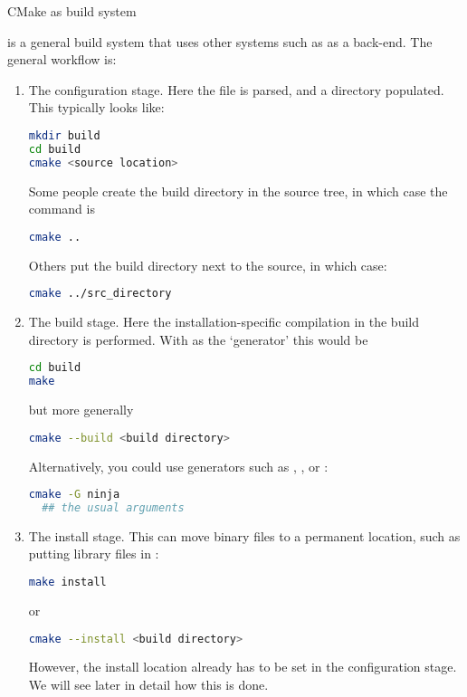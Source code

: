  {CMake as build system}

 is a general build system that uses other systems
such as  as a back-end.
The general workflow is:
\begin{enumerate}
\item The configuration stage. Here the  file
  is parsed, and a  directory populated. This typically looks like:
\begin{lstlisting}[language=bash]
mkdir build
cd build
cmake <source location>
\end{lstlisting}
Some people create the build directory in the source tree,
in which case the  command is
\begin{lstlisting}[language=bash]
cmake ..
\end{lstlisting}
Others put the build directory next to the source, in which case:
\begin{lstlisting}[language=bash]
cmake ../src_directory
\end{lstlisting}
\item The build stage. Here the installation-specific compilation
  in the build directory is performed.
  With  as the `generator' this would be
\begin{lstlisting}[language=bash]
cd build
make
\end{lstlisting}
but more generally
\begin{lstlisting}[language=bash]
cmake --build <build directory>
\end{lstlisting}
Alternatively, you could use generators such as ,
, or :
\begin{lstlisting}[language=bash]
cmake -G ninja
  ## the usual arguments
\end{lstlisting}
\item The install stage. This can move binary files to a permanent
  location, such as putting library files in :
\begin{lstlisting}[language=bash]
make install
\end{lstlisting}
or 
\begin{lstlisting}[language=bash]
cmake --install <build directory>
\end{lstlisting}
However, the install location already has to be set in the configuration stage.
We will see later in detail how this is done.
\end{enumerate}

